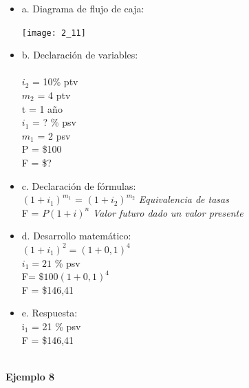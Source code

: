 \begin{itemize}
	\item a. Diagrama de flujo de caja:
	
	\begin{center}
		\texttt{[image: 2\_11]}\\
	\end{center}
	
	\item b. Declaración de variables:\\ \\
	
	
	
	$i_{2}$ = 10\% ptv \\
	$m_{2}$ = 4 ptv\\
	t = 1 año\\
	$i_{1}$ = ? \% psv \\
	$m_{1}$ = 2 psv\\
	P = \$100\\
	F = \$?\\
	 
	
	\item c. Declaración de fórmulas:\\
	
	
	$(1+i_{1})^{m_{1}}$ = $(1+i_{2})^{m_{2}}$ \hspace{35 pt} \textit{Equivalencia de tasas}\\
    F = $ P(1 + i)^n$ \hspace{70 pt} \textit{Valor futuro dado un valor presente}\\
	\item d. Desarrollo matemático:\\
	
    $(1+i_{1})^{2} = (1+0,1)^{4}$\\
    
    $i_{1} = 21$ \% psv \\  
	 	
	
	   F= $\$100 (1 + 0,1)^{4}$ \\
       F = \$146,41
       
 \item e. Respuesta:\\
	
	i$_{1}$ = 21 \% psv \\
	F = \$146,41 \\\\
	
	
\end{itemize}

\textbf{Ejemplo 8}\\

